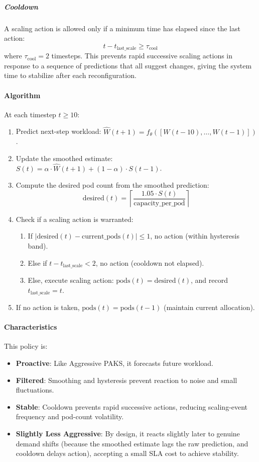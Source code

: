 \subparagraph{Cooldown} A scaling action is allowed only if a minimum time has elapsed since the last action:
\[
t - t_{\text{last\_scale}} \geq \tau_{\text{cool}}
\]
where $\tau_{\text{cool}} = 2$ timesteps. This prevents rapid successive scaling actions in response to a sequence of predictions that all suggest changes, giving the system time to stabilize after each reconfiguration.

\paragraph{Algorithm} At each timestep $t \geq 10$:
\begin{enumerate}
  \item Predict next-step workload: $\hat{W}(t+1) = f_{\theta}([W(t-10), \ldots, W(t-1)])$.
  \item Update the smoothed estimate: $S(t) = \alpha \cdot \hat{W}(t+1) + (1 - \alpha) \cdot S(t-1)$.
  \item Compute the desired pod count from the smoothed prediction:
  \[
  \text{desired}(t) = \left\lceil \frac{1.05 \cdot S(t)}{\text{capacity\_per\_pod}} \right\rceil
  \]
  \item Check if a scaling action is warranted:
  \begin{enumerate}
    \item If $|\text{desired}(t) - \text{current\_pods}(t)| \leq 1$, no action (within hysteresis band).
    \item Else if $t - t_{\text{last\_scale}} < 2$, no action (cooldown not elapsed).
    \item Else, execute scaling action: $\text{pods}(t) = \text{desired}(t)$, and record $t_{\text{last\_scale}} = t$.
  \end{enumerate}
  \item If no action is taken, $\text{pods}(t) = \text{pods}(t-1)$ (maintain current allocation).
\end{enumerate}

\paragraph{Characteristics} This policy is:
\begin{itemize}
  \item \textbf{Proactive}: Like Aggressive PAKS, it forecasts future workload.
  \item \textbf{Filtered}: Smoothing and hysteresis prevent reaction to noise and small fluctuations.
  \item \textbf{Stable}: Cooldown prevents rapid successive actions, reducing scaling-event frequency and pod-count volatility.
  \item \textbf{Slightly Less Aggressive}: By design, it reacts slightly later to genuine demand shifts (because the smoothed estimate lags the raw prediction, and cooldown delays action), accepting a small SLA cost to achieve stability.
\end{itemize}

